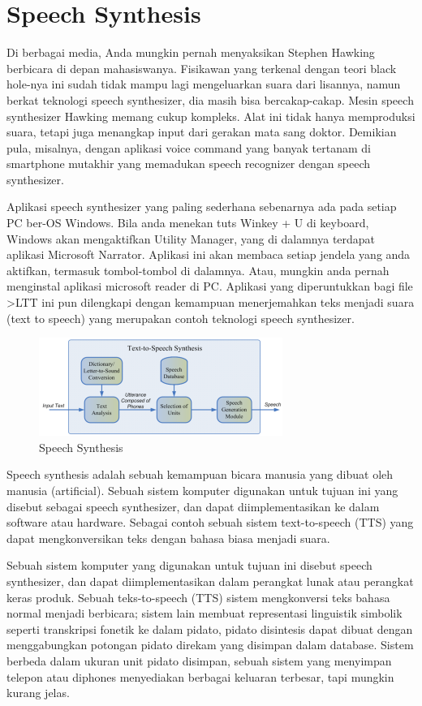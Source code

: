 \section{Speech Synthesis}
Di berbagai media, Anda mungkin pernah menyaksikan Stephen Hawking berbicara di depan mahasiswanya. Fisikawan yang terkenal dengan teori black hole-nya ini sudah tidak mampu lagi mengeluarkan suara dari lisannya, namun berkat teknologi speech synthesizer, dia masih bisa bercakap-cakap. Mesin speech synthesizer Hawking memang cukup kompleks. Alat ini tidak hanya memproduksi suara, tetapi juga menangkap input dari gerakan mata sang doktor. Demikian pula, misalnya, dengan aplikasi voice command yang banyak tertanam di smartphone mutakhir yang memadukan speech recognizer dengan speech synthesizer.

Aplikasi speech synthesizer yang paling sederhana sebenarnya ada pada setiap PC ber-OS Windows. Bila anda menekan tuts Winkey + U di keyboard, Windows akan mengaktifkan Utility Manager, yang di dalamnya terdapat aplikasi Microsoft Narrator. Aplikasi ini akan membaca setiap jendela yang anda aktifkan, termasuk tombol-tombol di dalamnya. Atau, mungkin anda pernah menginstal aplikasi microsoft reader di PC. Aplikasi yang diperuntukkan bagi file >LTT ini pun dilengkapi dengan kemampuan menerjemahkan teks menjadi suara (text to speech) yang merupakan contoh teknologi speech synthesizer.

\begin{figure}[H]
        \centerline{\includegraphics[scale=.75]{figures/speech}}
        \caption{Speech Synthesis}
		\label{speech}
\end{figure}

Speech synthesis adalah sebuah kemampuan bicara manusia yang dibuat oleh manusia (artificial). Sebuah sistem komputer digunakan untuk tujuan ini yang disebut sebagai speech synthesizer, dan dapat diimplementasikan ke dalam software atau hardware. Sebagai contoh sebuah sistem text-to-speech (TTS) yang dapat mengkonversikan teks dengan bahasa biasa menjadi suara.

Sebuah sistem komputer yang digunakan untuk tujuan ini disebut speech synthesizer, dan dapat diimplementasikan dalam perangkat lunak atau perangkat keras produk. Sebuah teks-to-speech (TTS) sistem mengkonversi teks bahasa normal menjadi berbicara; sistem lain membuat representasi linguistik simbolik seperti transkripsi fonetik ke dalam pidato, pidato disintesis dapat dibuat dengan menggabungkan potongan pidato direkam yang disimpan dalam database. Sistem berbeda dalam ukuran unit pidato disimpan, sebuah sistem yang menyimpan telepon atau diphones menyediakan berbagai keluaran terbesar, tapi mungkin kurang jelas.

